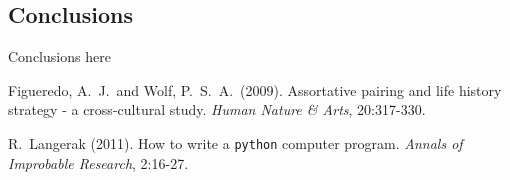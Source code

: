 \documentclass[twoside]{article}
\begin{document}
\begin{multicols}{2}
\section{Conclusions}

Conclusions here 

 
\begin{thebibliography}{99}

Figueredo, A.~J.\ and Wolf, P.\ S.~A.\ (2009).
Assortative pairing and life history strategy - a cross-cultural study.
\emph{Human Nature \& Arts}, 20:317-330.

R.\ Langerak  (2011).
How to write a {\tt python} computer program.
\emph{Annals of Improbable Research}, 2:16-27.

\end{thebibliography}


\end{multicols}
\end{document}
